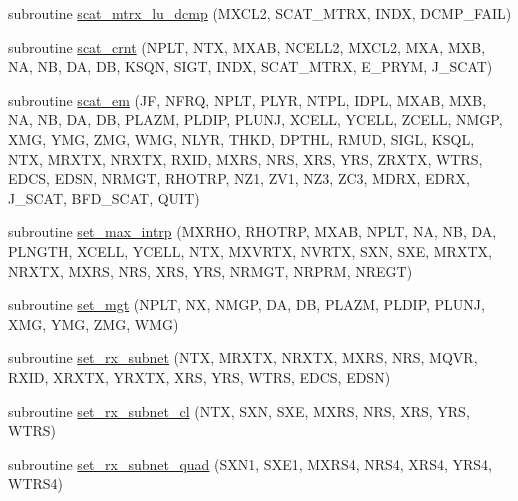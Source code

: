 \begin{DoxyCompactItemize}
\item 
subroutine \hyperlink{Leroi__c_8f90_aeb059f2d64018397965c145c4af183ff}{scat\+\_\+mtrx\+\_\+lu\+\_\+dcmp} (M\+X\+C\+L2, S\+C\+A\+T\+\_\+\+M\+T\+RX, I\+N\+DX, D\+C\+M\+P\+\_\+\+F\+A\+IL)
\item 
subroutine \hyperlink{Leroi__c_8f90_aef77ff6f17e654fc7f89a638ad1d2d46}{scat\+\_\+crnt} (N\+P\+LT, N\+TX, M\+X\+AB, N\+C\+E\+L\+L2, M\+X\+C\+L2, M\+XA, M\+XB, NA, NB, DA, DB, K\+S\+QN, S\+I\+GT, I\+N\+DX, S\+C\+A\+T\+\_\+\+M\+T\+RX, E\+\_\+\+P\+R\+YM, J\+\_\+\+S\+C\+AT)
\item 
subroutine \hyperlink{Leroi__c_8f90_a75fe85be755349539d5b76874d678237}{scat\+\_\+em} (JF, N\+F\+RQ, N\+P\+LT, P\+L\+YR, N\+T\+PL, I\+D\+PL, M\+X\+AB, M\+XB, NA, NB, DA, DB, P\+L\+A\+ZM, P\+L\+D\+IP, P\+L\+U\+NJ, X\+C\+E\+LL, Y\+C\+E\+LL, Z\+C\+E\+LL, N\+M\+GP, X\+MG, Y\+MG, Z\+MG, W\+MG, N\+L\+YR, T\+H\+KD, D\+P\+T\+HL, R\+M\+UD, S\+I\+GL, K\+S\+QL, N\+TX, M\+R\+X\+TX, N\+R\+X\+TX, R\+X\+ID, M\+X\+RS, N\+RS, X\+RS, Y\+RS, Z\+R\+X\+TX, W\+T\+RS, E\+D\+CS, E\+D\+SN, N\+R\+M\+GT, R\+H\+O\+T\+RP, N\+Z1, Z\+V1, N\+Z3, Z\+C3, M\+D\+RX, E\+D\+RX, J\+\_\+\+S\+C\+AT, B\+F\+D\+\_\+\+S\+C\+AT, Q\+U\+IT)
\item 
subroutine \hyperlink{Leroi__c_8f90_a27d896475f3529fb2188ec4474b27717}{set\+\_\+max\+\_\+intrp} (M\+X\+R\+HO, R\+H\+O\+T\+RP, M\+X\+AB, N\+P\+LT, NA, NB, DA, P\+L\+N\+G\+TH, X\+C\+E\+LL, Y\+C\+E\+LL, N\+TX, M\+X\+V\+R\+TX, N\+V\+R\+TX, S\+XN, S\+XE, M\+R\+X\+TX, N\+R\+X\+TX, M\+X\+RS, N\+RS, X\+RS, Y\+RS, N\+R\+M\+GT, N\+R\+P\+RM, N\+R\+E\+GT)
\item 
subroutine \hyperlink{Leroi__c_8f90_a820f6bd31435032872330d97a6fdf404}{set\+\_\+mgt} (N\+P\+LT, NX, N\+M\+GP, DA, DB, P\+L\+A\+ZM, P\+L\+D\+IP, P\+L\+U\+NJ, X\+MG, Y\+MG, Z\+MG, W\+MG)
\item 
subroutine \hyperlink{Leroi__c_8f90_a9100f1607055290b050e961c8027016a}{set\+\_\+rx\+\_\+subnet} (N\+TX, M\+R\+X\+TX, N\+R\+X\+TX, M\+X\+RS, N\+RS, M\+Q\+VR, R\+X\+ID, X\+R\+X\+TX, Y\+R\+X\+TX, X\+RS, Y\+RS, W\+T\+RS, E\+D\+CS, E\+D\+SN)
\item 
subroutine \hyperlink{Leroi__c_8f90_a805e33739aa8ba4bfe42148473309ce0}{set\+\_\+rx\+\_\+subnet\+\_\+cl} (N\+TX, S\+XN, S\+XE, M\+X\+RS, N\+RS, X\+RS, Y\+RS, W\+T\+RS)
\item 
subroutine \hyperlink{Leroi__c_8f90_a397597f84bff232d8a1a2f4a44e6e75f}{set\+\_\+rx\+\_\+subnet\+\_\+quad} (S\+X\+N1, S\+X\+E1, M\+X\+R\+S4, N\+R\+S4, X\+R\+S4, Y\+R\+S4, W\+T\+R\+S4)
\item 

\end{DoxyCompactItemize}
